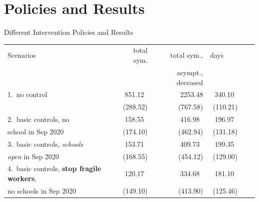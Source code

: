 \documentclass[8pt]{beamer}
\begin{document}
\section{Policies and Results}


\begin{frame}{Different Intervention Policies and Results}

\begin{table}[H]
\center
\footnotesize
\begin{tabular}{lrrrrr}
\toprule
Scenarios                              &  total sym.  & total sym.,       & days~~~~  \\
{}                                           &                    & asympt., deceased   \\                               
\midrule
1.~no control                       &  {\color{red}851.12}~     &  {\color{red}2253.48}         &  340.10~  \\
                                            &  (288.52)    &  (767.58)         &  (110.21) \\
\midrule
2.~basic controls, no           &   {\color{blue}158.55}~    &  {\color{blue}416.98}~         &  196.97~  \\
 school in Sep 2020            &   (174.10)     &  (462.94)        &  (131.18) \\
\midrule
3.~basic controls, \emph{schools}   &   {\color{blue}153.71}~    &       {\color{blue}409.73}~       &  199.35~  \\
 \emph{open} in Sep 2020                &  (168.55)   &     (454.12)        &  (129.00) \\
\midrule
4.~basic controls, \textbf{stop  fragile workers},   &   {\color{orange}120.17}~   &      {\color{orange}334.68}~         &  181.10~   \\
 no  schools in Sep 2020                          &   (149.10)  &     (413.90)         &   (125.46) \\
\midrule

\end{tabular}
\end{table}
\end{frame}
\end{document}
